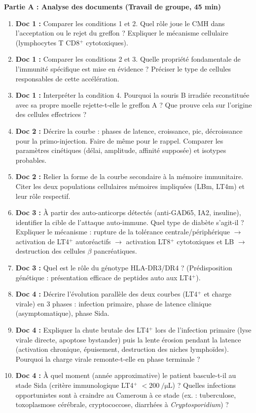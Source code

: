 \documentclass[11pt]{article}
\newcounter{popsec}
\newcounter{popsub}
\newcommand{\courssub}[1]{%
  \stepcounter{popsub}%
  \par\vspace{9pt}\noindent{\popxbold\fontsize{11.5}{13}\selectfont\color{popink}{\color{poporange}\thepopsec.\thepopsub}\hspace{6pt}#1}\par\nopagebreak\vspace{4pt}
}
\begin{document}
\courssub{Consignes}
\textbf{Partie A : Analyse des documents (Travail de groupe, 45 min)}
\begin{enumerate}
    \item \textbf{Doc 1 :} Comparer les conditions 1 et 2. Quel rôle joue le CMH dans l'acceptation ou le rejet du greffon ? Expliquer le mécanisme cellulaire (lymphocytes T CD8$^+$ cytotoxiques).
    \item \textbf{Doc 1 :} Comparer les conditions 2 et 3. Quelle propriété fondamentale de l'immunité spécifique est mise en évidence ? Préciser le type de cellules responsables de cette accélération.
    \item \textbf{Doc 1 :} Interpréter la condition 4. Pourquoi la souris B irradiée reconstituée avec sa propre moelle rejette-t-elle le greffon A ? Que prouve cela sur l'origine des cellules effectrices ?
    \item \textbf{Doc 2 :} Décrire la courbe : phases de latence, croissance, pic, décroissance pour la primo-injection. Faire de même pour le rappel. Comparer les paramètres cinétiques (délai, amplitude, affinité supposée) et isotypes probables.
    \item \textbf{Doc 2 :} Relier la forme de la courbe secondaire à la mémoire immunitaire. Citer les deux populations cellulaires mémoires impliquées (LBm, LT4m) et leur rôle respectif.
    \item \textbf{Doc 3 :} À partir des auto-anticorps détectés (anti-GAD65, IA2, insuline), identifier la cible de l'attaque auto-immune. Quel type de diabète s'agit-il ? Expliquer le mécanisme : rupture de la tolérance centrale/périphérique $\rightarrow$ activation de LT4$^+$ autoréactifs $\rightarrow$ activation LT8$^+$ cytotoxiques et LB $\rightarrow$ destruction des cellules $\beta$ pancréatiques.
    \item \textbf{Doc 3 :} Quel est le rôle du génotype HLA-DR3/DR4 ? (Prédisposition génétique : présentation efficace de peptides auto aux LT4$^+$).
    \item \textbf{Doc 4 :} Décrire l'évolution parallèle des deux courbes (LT4$^+$ et charge virale) en 3 phases : infection primaire, phase de latence clinique (asymptomatique), phase Sida.
    \item \textbf{Doc 4 :} Expliquer la chute brutale des LT4$^+$ lors de l'infection primaire (lyse virale directe, apoptose bystander) puis la lente érosion pendant la latence (activation chronique, épuisement, destruction des niches lymphoïdes). Pourquoi la charge virale remonte-t-elle en phase terminale ?
    \item \textbf{Doc 4 :} À quel moment (année approximative) le patient bascule-t-il au stade Sida (critère immunologique LT4$^+$ $< \SI{200}{\per\micro\liter}$) ? Quelles infections opportunistes sont à craindre au Cameroun à ce stade (ex. : tuberculose, toxoplasmose cérébrale, cryptococcose, diarrhées à \emph{Cryptosporidium}) ?
\end{enumerate}
\end{document}
